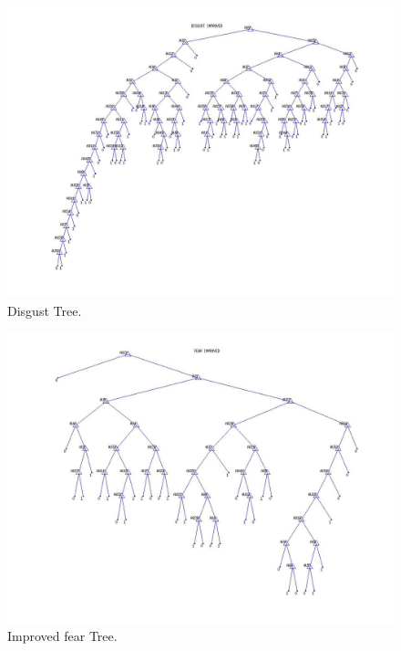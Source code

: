 \documentclass[a4paper,12pt,oneside,final]{report}
\newenvironment{changemargin}[2]{\begin{list}{}{%
\setlength{\topsep}{0pt}%
\setlength{\leftmargin}{0pt}%
\setlength{\rightmargin}{0pt}%
\setlength{\listparindent}{\parindent}%
\setlength{\itemindent}{\parindent}%
\setlength{\parsep}{0pt plus 1pt}%
\addtolength{\leftmargin}{#1}%
\addtolength{\rightmargin}{#2}%
}\item }{\end{list}}
\begin{document}
\begin{appendices}
\begin{figure}[!h]
\begin{changemargin}{-20mm}{-20mm}
\center
\includegraphics[scale=0.5]{disgust_improved.jpg}
\caption{Disgust Tree.}
\end{changemargin}
\end{figure}

\begin{figure}[!h]
\begin{changemargin}{-25mm}{-25mm}
\center
\includegraphics[scale=0.5]{fear_improved.jpg}
\caption{Improved fear Tree.}
\end{changemargin}
\end{figure}



\end{appendices}
\end{document}
